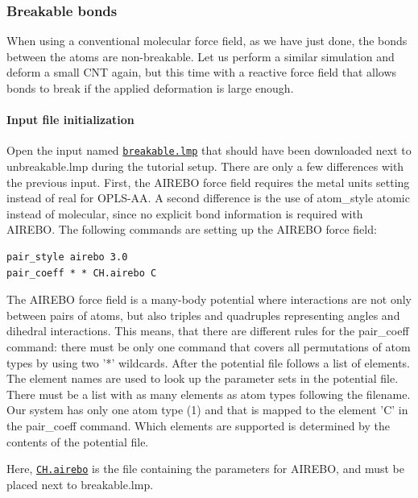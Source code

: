 \documentclass[9pt,tutorial]{livecoms}
\newcommand{\lmpcmd}[1]{\hspace{0pt}\colorbox{listing}{\textcolor{command}{\small{#1}}}\hspace{0pt}} %
\newcommand{\dwlcmd}[1]{\textcolor{download}{\texttt{#1}}} %
\newcommand{\filepath}{https://raw.githubusercontent.com/lammpstutorials/lammpstutorials-article/main/files/}
\begin{document}
\subsubsection{Breakable bonds}

When using a conventional molecular force field, as we have just done,
the bonds between the atoms are non-breakable.  Let us perform a similar
simulation and deform a small CNT again, but this time with a reactive
force field that allows bonds to break if the applied deformation is
large enough.

\paragraph{Input file initialization}

Open the input named \href{\filepath tutorial2/breakable.lmp}{\dwlcmd{breakable.lmp}}
that should have been downloaded next to \lmpcmd{unbreakable.lmp} during
the tutorial setup.  There are only a few differences with the previous
input.  First, the AIREBO force field requires the \lmpcmd{metal} units
setting instead of \lmpcmd{real} for OPLS-AA.  A second difference is
the use of \lmpcmd{atom\_style atomic} instead of
\lmpcmd{molecular}, since no explicit bond information is required with
AIREBO.  The following commands are setting up the AIREBO force field:
\begin{lstlisting}
pair_style airebo 3.0
pair_coeff * * CH.airebo C
\end{lstlisting}
\begin{note} {\color{blue}The AIREBO force field is a many-body
    potential where interactions are not only between pairs of atoms,
    but also triples and quadruples representing angles and dihedral
    interactions.  This means, that there are different rules for the
    \lmpcmd{pair\_coeff} command: there must be only one command that
    covers all permutations of atom types by using two '*' wildcards.
    After the potential file follows a list of elements.  The element
    names are used to look up the parameter sets in the potential file.
    There must be a list with as many elements as atom types following
    the filename.  Our system has only one atom type (1) and that is
    mapped to the element 'C' in the \lmpcmd{pair\_coeff} command.
    Which elements are supported is determined by the contents of the
    potential file.  }
\end{note}
Here, \href{\filepath tutorial2/CH.airebo}{\dwlcmd{CH.airebo}} is the
file containing the parameters for AIREBO, and must be placed next to
\lmpcmd{breakable.lmp}.
\end{document}

